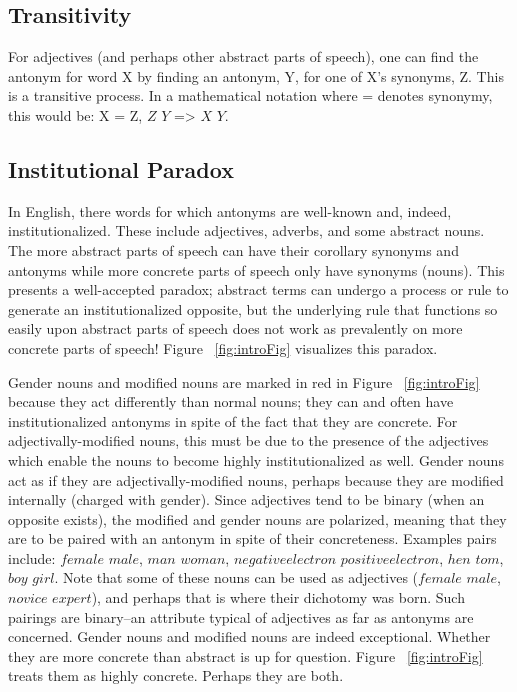 \subsection {Transitivity} For adjectives (and perhaps other abstract parts of speech), one can find the antonym for word X by finding an antonym, Y, for one of X’s synonyms, Z.  This is a transitive process.  In a mathematical notation where = denotes synonymy, this would be: X = Z, $Z$ \opp $Y$ => $X$ \opp $Y$.

\subsection {Institutional Paradox} In English, there words for which antonyms are well-known and, indeed, institutionalized.  These include adjectives, adverbs, and some abstract nouns.  The more abstract parts of speech can have their corollary synonyms and antonyms while more concrete parts of speech only have synonyms (nouns). This presents a well-accepted paradox; abstract terms can undergo a process or rule to generate an institutionalized opposite, but the underlying rule that functions so easily upon abstract parts of speech does not work as prevalently on more concrete parts of speech!  Figure ~\ref{fig:introFig} visualizes this paradox.

Gender nouns and modified nouns are marked in red in Figure ~\ref{fig:introFig} because they act differently than normal nouns; they can and often have institutionalized antonyms in spite of the fact that they are concrete.  For adjectivally-modified nouns, this must be due to the presence of the adjectives which enable the nouns to become highly institutionalized as well.  Gender nouns act as if they are adjectivally-modified nouns, perhaps because they are modified internally (charged with gender).  Since adjectives tend to be binary (when an opposite exists), the modified and gender nouns are polarized, meaning that they are to be paired with an antonym in spite of their concreteness.  Examples pairs include: $female$ \opp $male$, $man$ \opp $woman$, $negative electron$ \opp $positive electron$, $hen$ \opp $tom$, $boy$ \opp $girl$.  Note that some of these nouns can be used as adjectives ($female$ \opp $male$, $novice$ \opp $expert$), and perhaps that is where their dichotomy was born.  Such pairings are binary--an attribute typical of adjectives as far as antonyms are concerned.  Gender nouns and modified nouns are indeed exceptional.  Whether they are more concrete than abstract is up for question.  Figure ~\ref{fig:introFig} treats them as highly concrete.  Perhaps they are both.    

